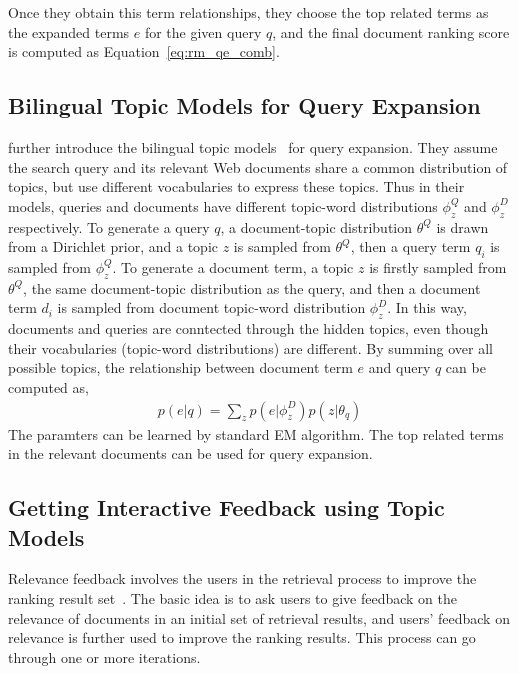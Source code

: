 Once they obtain this term relationships, they choose the top related terms as the expanded terms $e$ for the given query $q$, and the final document ranking score is computed as Equation~\ref{eq:rm_qe_comb}.

\subsection{Bilingual Topic Models for Query Expansion}

\cite{Gao-2012} further introduce the bilingual topic models~\citep{Gao-2011} for query expansion. They assume the search query and its relevant Web documents share a common distribution of topics, but use different vocabularies to express these topics. Thus in their models, queries and documents have different topic-word distributions $\phi_z^Q$ and $\phi_z^D$ respectively. To generate a query $q$, a document-topic distribution $\theta^Q$ is drawn from a Dirichlet prior, and a topic $z$ is sampled from $\theta^Q$, then a query term $q_i$ is sampled from $\phi_z^Q$. To generate a document term, a topic $z$ is firstly sampled from $\theta^Q$, the same document-topic distribution as the query, and then a document term $d_i$ is sampled from document topic-word distribution $\phi_z^D$. In this way, documents and queries are conntected through the hidden topics, even though their vocabularies (topic-word distributions) are different. By summing over all possible topics, the relationship between document term $e$ and query $q$ can be computed as,
\begin{align}
p(e|q) = \sum_z p(e|\phi_z^D) p(z | \theta_q)
\end{align}
The paramters can be learned by standard EM algorithm. The top related terms in the relevant documents can be used for query expansion.


\subsection{Getting Interactive Feedback using Topic Models}

Relevance feedback involves the users in the retrieval process to improve the ranking result set~\citep{Rocchio-1971}. The basic idea is to ask users to give feedback on the relevance of documents in an initial set of retrieval results, and users' feedback on relevance is further used to improve the ranking results. This process can go through one or more iterations.

